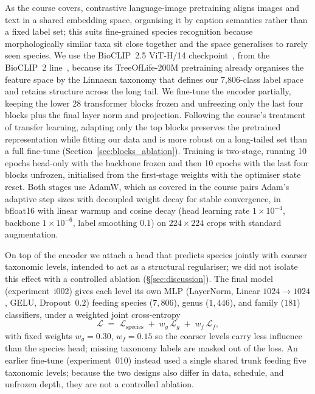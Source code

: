 As the course covers, contrastive language-image pretraining aligns images and text in a shared embedding space, organising it by caption semantics rather than a fixed label set; this suits fine-grained species recognition because morphologically similar taxa sit close together and the space generalises to rarely seen species. We use the BioCLIP~2.5 ViT-H/14 checkpoint~\cite{bioclip25hf}, from the BioCLIP~2 line~\cite{gu2025bioclip2}, because its TreeOfLife-200M pretraining already organises the feature space by the Linnaean taxonomy that defines our 7{,}806-class label space and retains structure across the long tail. We fine-tune the encoder partially, keeping the lower 28 transformer blocks frozen and unfreezing only the last four blocks plus the final layer norm and projection. Following the course's treatment of transfer learning, adapting only the top blocks preserves the pretrained representation while fitting our data and is more robust on a long-tailed set than a full fine-tune (Section~\ref{sec:blocks_ablation}). Training is two-stage, running 10 epochs head-only with the backbone frozen and then 10 epochs with the last four blocks unfrozen, initialised from the first-stage weights with the optimiser state reset. Both stages use AdamW, which as covered in the course pairs Adam's adaptive step sizes with decoupled weight decay for stable convergence, in bfloat16 with linear warmup and cosine decay (head learning rate $1{\times}10^{-4}$, backbone $1{\times}10^{-6}$, label smoothing $0.1$) on $224{\times}224$ crops with standard augmentation.

On top of the encoder we attach a head that predicts species jointly with coarser taxonomic levels, intended to act as a structural regulariser; we did not isolate this effect with a controlled ablation (\S\ref{sec:discussion}). The final model (experiment~i002) gives each level its own MLP (LayerNorm, Linear $1024{\to}1024$, GELU, Dropout~$0.2$) feeding species ($7{,}806$), genus ($1{,}446$), and family ($181$) classifiers, under a weighted joint cross-entropy
\begin{equation}
  \mathcal{L} \;=\; \mathcal{L}_{\text{species}} \;+\; w_g\,\mathcal{L}_{g} \;+\; w_f\,\mathcal{L}_{f},
\end{equation}
with fixed weights $w_g{=}0.30$, $w_f{=}0.15$ so the coarser levels carry less influence than the species head; missing taxonomy labels are masked out of the loss. An earlier fine-tune (experiment~010) instead used a single shared trunk feeding five taxonomic levels; because the two designs also differ in data, schedule, and unfrozen depth, they are not a controlled ablation.

